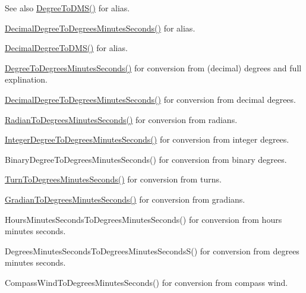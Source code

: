 \begin{DoxySeeAlso}{See also}
\mbox{\hyperlink{group___e_g_x_math-_angle_conversions-_degree_ga1096d04647918e20f61fb184ba2a7dce}{Degree\+To\+D\+M\+S()}} for alias. 

\mbox{\hyperlink{group___e_g_x_math-_angle_conversions-_decimal_degree_gac5a5255c8d120f71b60d8f60de1a1b6e}{Decimal\+Degree\+To\+Degrees\+Minutes\+Seconds()}} for alias. 

\mbox{\hyperlink{group___e_g_x_math-_angle_conversions-_decimal_degree_ga64a1b298ce16e9edf3209b678a7bed46}{Decimal\+Degree\+To\+D\+M\+S()}} for alias. 

\mbox{\hyperlink{group___e_g_x_math-_angle_conversions-_degree_ga859585939255d52d010c780c68eb6e23}{Degree\+To\+Degrees\+Minutes\+Seconds()}} for conversion from (decimal) degrees and full explination. 

\mbox{\hyperlink{group___e_g_x_math-_angle_conversions-_decimal_degree_gac5a5255c8d120f71b60d8f60de1a1b6e}{Decimal\+Degree\+To\+Degrees\+Minutes\+Seconds()}} for conversion from decimal degrees. 

\mbox{\hyperlink{group___e_g_x_math-_angle_conversions-_radian_gadae98c255924fdc8b232b6539eae81a9}{Radian\+To\+Degrees\+Minutes\+Seconds()}} for conversion from radians. 

\mbox{\hyperlink{group___e_g_x_math-_angle_conversions-_integer_degree_ga204317877546ea6bbafe5ff558f55a16}{Integer\+Degree\+To\+Degrees\+Minutes\+Seconds()}} for conversion from integer degrees. 

Binary\+Degree\+To\+Degrees\+Minutes\+Seconds() for conversion from binary degrees. 

\mbox{\hyperlink{group___e_g_x_math-_angle_conversions-_turn_gaefdee18d878c2e66e7bd737c8900ab30}{Turn\+To\+Degrees\+Minutes\+Seconds()}} for conversion from turns. 

\mbox{\hyperlink{group___e_g_x_math-_angle_conversions-_gradian_ga5c81967ddb8f677634d161713174e419}{Gradian\+To\+Degrees\+Minutes\+Seconds()}} for conversion from gradians. 

Hours\+Minutes\+Seconds\+To\+Degrees\+Minutes\+Seconds() for conversion from hours minutes seconds. 

Degrees\+Minutes\+Seconds\+To\+Degrees\+Minutes\+Seconds\+S() for conversion from degrees minutes seconds. 

Compass\+Wind\+To\+Degrees\+Minutes\+Seconds() for conversion from compass wind. 
\end{DoxySeeAlso}
\mbox{\label{group___e_g_x_math-_angle_conversions-_degree_ga1096d04647918e20f61fb184ba2a7dce}} 
